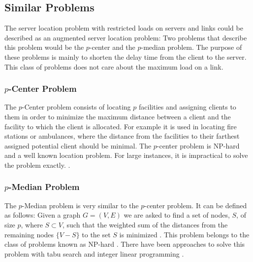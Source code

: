 \documentclass [12pt]{article}
\begin{document}
\subsection {Similar Problems}
The server location problem with restricted loads on servers and links could be described as an augmented server location problem: 
Two problems that describe this problem would be the $p$-center and the
$p$-median problem. The purpose of these problems is mainly to shorten the delay
time from the client to the server. 
This class of problems does not care about the maximum load on a link.

\subsubsection {$p$-Center Problem}
The $p$-Center problem consists of locating $p$ facilities and assigning clients
to them in order to minimize the maximum distance between a client and the facility
to which the client is allocated. For example it is used in locating fire stations or ambulances,
where the distance from the facilities 
to their farthest assigned potential client should be minimal.
The $p$-center problem is NP-hard and a well known location problem.
For large instances, it is impractical to solve the problem exactly.
\cite{KarivHakimi1979}.

\subsubsection {$p$-Median Problem}
The $p$-Median problem is very similar to the $p$-center problem. It can be defined as follows:
Given a graph $G=(V,E)$ we are asked to find a set of nodes, $S$, of size $p$, where $ S\subset V$, such that the weighted
sum of the distances from the remaining nodes $\{V-S\}$ to the set $S$ is minimized \cite{Rolland1997329}.
This problem belongs to the class of problems known as NP-hard \cite{KarivHakimi1979median}. There have been
approaches to solve this problem with tabu search \cite{Rolland1997329} and integer linear programming 
\cite{rosing1979p}.


\end{document}
